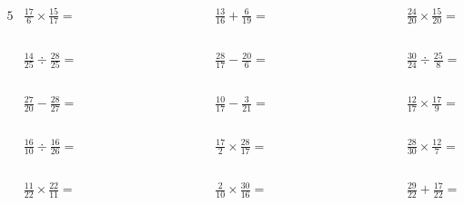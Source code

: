\documentclass[fleqn, 12pt]{extarticle}
\begin{document}
\begin{alignat*}{5}
&\frac{17}{6} \times \frac{15}{17} = \qquad \qquad \qquad \qquad \qquad
&\frac{13}{16} + \frac{6}{19} = \qquad \qquad \qquad \qquad \qquad
&\frac{24}{20} \times \frac{15}{20} = \qquad \qquad \qquad \qquad \qquad\\
\\
\\
\\
\\
&\frac{14}{25} \div \frac{28}{25} = \qquad \qquad \qquad \qquad \qquad
&\frac{28}{17} - \frac{20}{6} = \qquad \qquad \qquad \qquad \qquad
&\frac{30}{24} \div \frac{25}{8} = \qquad \qquad \qquad \qquad \qquad\\
\\
\\
\\
\\
&\frac{27}{20} - \frac{28}{27} = \qquad \qquad \qquad \qquad \qquad
&\frac{10}{17} - \frac{3}{21} = \qquad \qquad \qquad \qquad \qquad
&\frac{12}{17} \times \frac{17}{9} = \qquad \qquad \qquad \qquad \qquad\\
\\
\\
\\
\\
&\frac{16}{10} \div \frac{16}{26} = \qquad \qquad \qquad \qquad \qquad
&\frac{17}{2} \times \frac{28}{17} = \qquad \qquad \qquad \qquad \qquad
&\frac{28}{30} \times \frac{12}{7} = \qquad \qquad \qquad \qquad \qquad\\
\\
\\
\\
\\
&\frac{11}{22} \times \frac{22}{11} = \qquad \qquad \qquad \qquad \qquad
&\frac{2}{10} \times \frac{30}{16} = \qquad \qquad \qquad \qquad \qquad
&\frac{29}{22} + \frac{17}{22} = \qquad \qquad \qquad \qquad \qquad\\
\\
\\
\\
\\
\end{alignat*}
\end{document}
